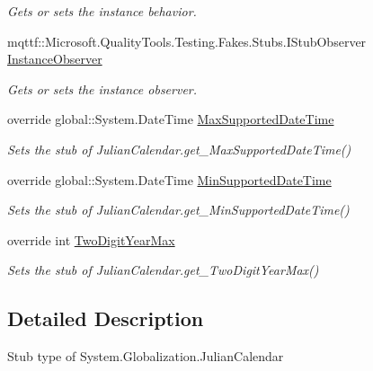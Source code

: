 \begin{DoxyCompactItemize}
\begin{DoxyCompactList}\small\item\em Gets or sets the instance behavior.\end{DoxyCompactList}\item 
mqttf\-::\-Microsoft.\-Quality\-Tools.\-Testing.\-Fakes.\-Stubs.\-I\-Stub\-Observer \hyperlink{class_system_1_1_globalization_1_1_fakes_1_1_stub_julian_calendar_a00ebbe352e8ab5f1856bd68b08dd7889}{Instance\-Observer}
\begin{DoxyCompactList}\small\item\em Gets or sets the instance observer.\end{DoxyCompactList}\item 
override global\-::\-System.\-Date\-Time \hyperlink{class_system_1_1_globalization_1_1_fakes_1_1_stub_julian_calendar_a70e40ae4e6ca7e62102aaa5aa5923f82}{Max\-Supported\-Date\-Time}
\begin{DoxyCompactList}\small\item\em Sets the stub of Julian\-Calendar.\-get\-\_\-\-Max\-Supported\-Date\-Time()\end{DoxyCompactList}\item 
override global\-::\-System.\-Date\-Time \hyperlink{class_system_1_1_globalization_1_1_fakes_1_1_stub_julian_calendar_a732ce34a6be92b88d7da4663aa960dfe}{Min\-Supported\-Date\-Time}
\begin{DoxyCompactList}\small\item\em Sets the stub of Julian\-Calendar.\-get\-\_\-\-Min\-Supported\-Date\-Time()\end{DoxyCompactList}\item 
override int \hyperlink{class_system_1_1_globalization_1_1_fakes_1_1_stub_julian_calendar_abbbf0aaee51fdf8528c0ef17313ba54c}{Two\-Digit\-Year\-Max}
\begin{DoxyCompactList}\small\item\em Sets the stub of Julian\-Calendar.\-get\-\_\-\-Two\-Digit\-Year\-Max()\end{DoxyCompactList}\end{DoxyCompactItemize}


\subsection{Detailed Description}
Stub type of System.\-Globalization.\-Julian\-Calendar




